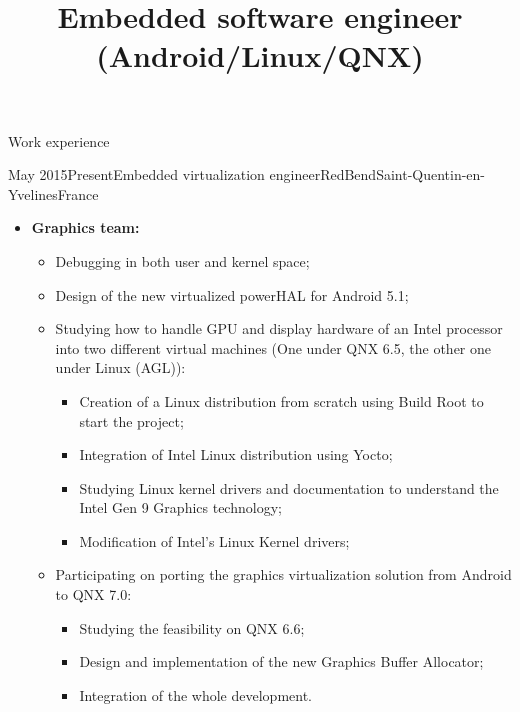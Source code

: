 \documentclass[a4paper, 10pt]{article}
\begin{document}




\begin {identity}
    \name {\personalFirstName}{\personalLastName}
\end {identity}

\title {Embedded software engineer (Android/Linux/QNX)}

\begin{section} {Work experience}
    \begin{experience}{May 2015}{Present}{Embedded virtualization engineer}{RedBend}{Saint-Quentin-en-Yvelines}{France}
	\begin{subexperience}
	    \begin{itemize}[parsep=0cm,itemsep=0cm,topsep=0cm]
		\item \textbf {Graphics team:}
		\begin{itemize}[parsep=0cm,itemsep=0cm,topsep=0cm]
		    \item Debugging in both user and kernel space;
		    \item Design of the new virtualized powerHAL for Android 5.1;
		    \item Studying how to handle GPU and display hardware of an Intel processor into two different virtual machines (One under QNX 6.5, the other one under Linux (AGL)):
		    \begin{itemize}[parsep=0cm,itemsep=0cm,topsep=0cm]
			\item Creation of a Linux distribution from scratch using Build Root to start the project;
			\item Integration of Intel Linux distribution using Yocto;
			\item Studying Linux kernel drivers and documentation to understand the Intel Gen 9 Graphics technology;
			\item Modification of Intel's Linux Kernel drivers;
		    \end{itemize}
		    \item Participating on porting the graphics virtualization solution from Android to QNX 7.0:
		    \begin{itemize}[parsep=0cm,itemsep=0cm,topsep=0cm]
			\item Studying the feasibility on QNX 6.6;
			\item Design and implementation of the new Graphics Buffer Allocator;
			\item Integration of the whole development.
		    \end{itemize}
		\end{itemize}
	    \end{itemize}
	\end{subexperience}
    \end{experience}


\end{section}
\end{document}
